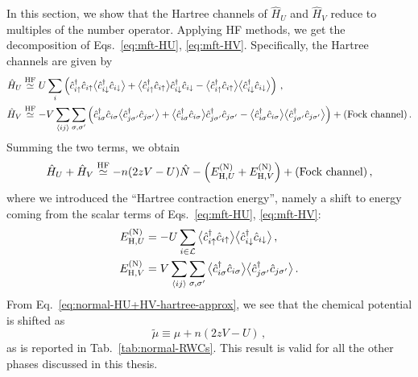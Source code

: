 In this section, we show that the Hartree channels of $\hat H_U$ and $\hat H_V$ reduce to multiples of the number operator. Applying HF methods, we get the decomposition of Eqs.~\eqref{eq:mft-HU}, \eqref{eq:mft-HV}. Specifically, the Hartree channels are given by
\[
\begin{aligned}
	\hat H_U &\HFsimeq U \sum_i \left(
		\hat c_{i\uparrow}^\dagger \hat c_{i\uparrow} \big\langle \hat c_{i\downarrow}^\dagger \hat c_{i\downarrow} \big\rangle + \big\langle \hat c_{i\uparrow}^\dagger \hat c_{i\uparrow} \big\rangle \hat c_{i\downarrow}^\dagger \hat c_{i\downarrow} - \big\langle \hat c_{i\uparrow}^\dagger \hat c_{i\uparrow} \big\rangle  \big\langle \hat c_{i\downarrow}^\dagger \hat c_{i\downarrow} \big\rangle 
	\right) \, , \\
	\hat H_V &\HFsimeq -V \sum_{\ev{ij}} \sum_{\sigma,\sigma'} \left(
		\hat c_{i\sigma}^\dagger \hat c_{i\sigma} \big\langle \hat c_{j\sigma'}^\dagger \hat c_{j\sigma'} \big\rangle + \big\langle \hat c_{i\sigma}^\dagger \hat c_{i\sigma} \big\rangle \hat c_{j\sigma'}^\dagger \hat c_{j\sigma'} - \big\langle \hat c_{i\sigma}^\dagger \hat c_{i\sigma} \big\rangle  \big\langle \hat c_{j\sigma'}^\dagger \hat c_{j\sigma'} \big\rangle
	\right) + (\text{Fock channel}) \, .
\end{aligned}
\]
Summing the two terms, we obtain
\begin{equation}\label{eq:normal-HU+HV-hartree-approx}
	\hat H_U + \hat H_V \stackrel{\mathrm{HF}}{\simeq} -n(2zV-U) \hat N - \left(E_{\mathrm{H},U}^{(\mathrm{N})} + E_{\mathrm{H},V}^{(\mathrm{N})}\right) + (\text{Fock channel}) \, ,
\end{equation}
where we introduced the ``Hartree contraction energy'', namely a shift to energy coming from the scalar terms of Eqs.~\eqref{eq:mft-HU}, \eqref{eq:mft-HV}:
\begin{align}
	E_{\mathrm{H},U}^{(\mathrm{N})} &= - U \sum_{i \in\mathcal{L}} \big\langle \hat c_{i\uparrow}^\dagger \hat c_{i\uparrow} \big\rangle  \big\langle \hat c_{i\downarrow}^\dagger \hat c_{i\downarrow} \big\rangle \, , \label{eq:normal-HU-hartree-Ec-implicit} \\
	E_{\mathrm{H},V}^{(\mathrm{N})} &= V \sum_{\ev{ij}} \sum_{\sigma,\sigma'} \big\langle \hat c_{i\sigma}^\dagger \hat c_{i\sigma} \big\rangle  \big\langle \hat c_{j\sigma'}^\dagger \hat c_{j\sigma'} \big\rangle \, . \label{eq:normal-HV-hartree-Ec-implicit}
\end{align}
From Eq.~\eqref{eq:normal-HU+HV-hartree-approx}, we see that the chemical potential is shifted as
\begin{equation}\label{eq:normal-mu-shift}
	\tilde{\mu} \equiv \mu + n(2zV-U) \, ,
\end{equation}
as is reported in Tab.~\ref{tab:normal-RWCs}. This result is valid for all the other phases discussed in this thesis.

